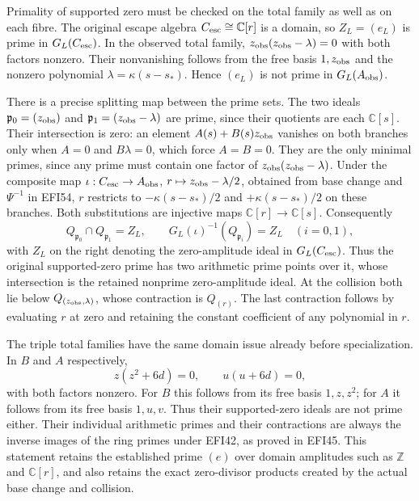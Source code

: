 \documentclass[
  10pt,
  a4paper,
]{article}
\begin{document}
Primality of supported zero must be checked on the total family as well
as on each fibre. The original escape algebra
\(C_{\rm esc}\cong\mathbb C[r]\) is a domain, so \(Z_L=(e_L)\) is prime
in \(G_L(C_{\rm esc})\). In the observed total family,
\(z_{\rm obs}(z_{\rm obs}-\lambda)=0\) with both factors nonzero. Their
nonvanishing follows from the free basis \(1,z_{\rm obs}\) and the
nonzero polynomial \(\lambda=\kappa(s-s_*)\). Hence \((e_L)\) is not
prime in \(G_L(A_{\rm obs})\).

There is a precise splitting map between the prime sets. The two ideals
\(\mathfrak p_0=(z_{\rm obs})\) and
\(\mathfrak p_1=(z_{\rm obs}-\lambda)\) are prime, since their quotients
are each \(\mathbb C[s]\). Their intersection is zero: an element
\(A(s)+B(s)z_{\rm obs}\) vanishes on both branches only when \(A=0\) and
\(B\lambda=0\), which force \(A=B=0\). They are the only minimal primes,
since any prime must contain one factor of
\(z_{\rm obs}(z_{\rm obs}-\lambda)\). Under the composite map
\(\iota:C_{\rm esc}\to A_{\rm obs}\),
\(r\mapsto z_{\rm obs}-\lambda/2\), obtained from base change and
\(\Psi^{-1}\) in EFI54, \(r\) restricts to \(-\kappa(s-s_*)/2\) and
\(+\kappa(s-s_*)/2\) on these branches. Both substitutions are injective
maps \(\mathbb C[r]\to\mathbb C[s]\). Consequently \[
Q_{\mathfrak p_0}\cap Q_{\mathfrak p_1}=Z_L,\qquad
G_L(\iota)^{-1}(Q_{\mathfrak p_i})=Z_L
\quad(i=0,1),
\tag{EFI67}
\] with \(Z_L\) on the right denoting the zero-amplitude ideal in
\(G_L(C_{\rm esc})\). Thus the original supported-zero prime has two
arithmetic prime points over it, whose intersection is the retained
nonprime zero-amplitude ideal. At the collision both lie below
\(Q_{(z_{\rm obs},\lambda)}\), whose contraction is \(Q_{(r)}\). The
last contraction follows by evaluating \(r\) at zero and retaining the
constant coefficient of any polynomial in \(r\).

The triple total families have the same domain issue already before
specialization. In \(B\) and \(A\) respectively, \[
z(z^2+6d)=0,\qquad u(u+6d)=0,
\tag{EFI68}
\] with both factors nonzero. For \(B\) this follows from its free basis
\(1,z,z^2\); for \(A\) it follows from its free basis \(1,u,v\). Thus
their supported-zero ideals are not prime either. Their individual
arithmetic primes and their contractions are always the inverse images
of the ring primes under EFI42, as proved in EFI45. This statement
retains the established prime \((e)\) over domain amplitudes such as
\(\mathbb Z\) and \(\mathbb C[r]\), and also retains the exact
zero-divisor products created by the actual base change and collision.
\end{document}
